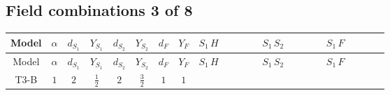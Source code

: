 \documentclass[8pt]{article}
\begin{document}
\begin{landscape}
\subsection*{Field combinations 3 of 8}
\begin{longtable}{@{}cccccccc >{\raggedright\arraybackslash}p{0.21\linewidth} >{\raggedright\arraybackslash}p{0.21\linewidth} >{\raggedright\arraybackslash}p{0.21\linewidth}@{}}
\toprule
Model & $\alpha$ & $d_{S_1}$ & $Y_{S_1}$ & $d_{S_2}$ & $Y_{S_2}$ & $d_F$ & $Y_F$ & $S_1\,H$ & $S_1\,S_2$ & $S_1\,F$ \\
\midrule
\endfirsthead
\toprule
Model & $\alpha$ & $d_{S_1}$ & $Y_{S_1}$ & $d_{S_2}$ & $Y_{S_2}$ & $d_F$ & $Y_F$ & $S_1\,H$ & $S_1\,S_2$ & $S_1\,F$ \\
\midrule
\endhead
T3-B & $1$ & $2$ & $\frac{1}{2}$ & $2$ & $\frac{3}{2}$ & $1$ & $1$ & \scriptsize\adjustbox{max width=\linewidth}{$\begin{gathered} -\frac{2 \hbar  \overline{y_{1,i_1,r_1}} \overline{Y_{e,i_2,i_3}} H_{a_2} S_{1,j_2} y_{1,i_2,r_1} Y_{e,i_1,i_3} \mathcal{I}_{y_1,a_1,j_2} {\mathcal{C}_{LS_1F}}^{*}_{a_2,j_1} H_{a_1}{}^{\dagger } S_{1,j_1}{}^{\dagger }}{\epsilon } \\ -2 \hbar  \overline{y_{1,i_1,r_1}} \overline{Y_{e,i_2,i_3}} H_{a_2} S_{1,j_2} y_{1,i_2,r_1} Y_{e,i_1,i_3} \mathcal{I}_{y_1,a_1,j_2} {\mathcal{C}_{LS_1F}}^{*}_{a_2,j_1} H_{a_1}{}^{\dagger } S_{1,j_1}{}^{\dagger } \\ +H_{a_2} S_{1,j_2} H_{a_1}{}^{\dagger } S_{1,j_1}{}^{\dagger } \mathcal{I}_{H1,a_1,a_2,j_1,j_2}{}^1 \lambda_{HS_1}^{(1)}^{(1)}\end{gathered}$} & \scriptsize\adjustbox{max width=\linewidth}{$\begin{gathered} +\frac{2 \hbar  \overline{y_{1,i_1,r_1}} \overline{y_{2,i_2,r_2}} S_{1,j_2} S_{2,j_1} y_{1,i_2,r_1} y_{2,i_1,r_2} S_{1,j_1}{}^{\dagger } S_{2,j_2}{}^{\dagger }}{\epsilon } \\ -\frac{2 \hbar  \overline{y_{1,i_1,r_1}} \overline{y_{2,i_2,r_2}} S_{1,j_1} S_{2,j_2} y_{1,i_2,r_1} y_{2,i_1,r_2} S_{1,j_1}{}^{\dagger } S_{2,j_2}{}^{\dagger }}{\epsilon } \\ -2 \hbar  \overline{y_{1,i_1,r_1}} \overline{y_{2,i_2,r_1}} S_{1,j_2} S_{2,j_1} y_{1,i_2,r_2} y_{2,i_1,r_2} S_{1,j_1}{}^{\dagger } S_{2,j_2}{}^{\dagger }\end{gathered}$} & \scriptsize\adjustbox{max width=\linewidth}{$\begin{gathered} +C_{S_1^\dagger S_1} \hbar  \log \left(\frac{\bar{\mu}^{2}}{M_F^2}\right) \overline{y_{1,i_1,r_1}} S_{1,j_1} y_{1,i_1,r_1} S_{1,j_1}{}^{\dagger } \\ -\hbar  \log \left(\frac{\bar{\mu}^{2}}{M_F^2}\right) \overline{y_{1,i_1,r_1}} \overline{y_{1,i_2,r_2}} S_{1,j_1} S_{1,j_2} y_{1,i_1,r_2} y_{1,i_2,r_1} S_{1,j_1}{}^{\dagger } S_{1,j_2}{}^{\dagger } \\ -\hbar  \log \left(\frac{\bar{\mu}^{2}}{M_F^2}\right) \overline{y_{1,i_1,r_1}} S_{1,j_3} S_{1,j_4} y_{1,i_1,r_1} S_{1,j_1}{}^{\dagger } S_{1,j_2}{}^{\dagger } \mathcal{I}_{S_1,j_1,j_3,j_2,j_4}{}^1 \lambda_{S_1}^{(1)}^{(1)}\end{gathered}$} \\

\end{longtable}
\end{landscape}
\end{document}
